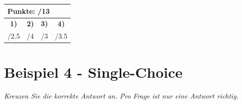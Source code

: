 \documentclass[11pt, a4paper]{article}
\begin{document}
\vfill
\begin{flushright}
\renewcommand{\arraystretch}{1.23}
\begin{tabular}{|c | c | c | c|}
\hline
\multicolumn{4}{|l|}{\textbf{\large{Punkte: \quad\quad\quad /13}}}\\
\hline
\textbf{1)} & \textbf{2)} & \textbf{3)} & \textbf{4)} \\
\quad/2.5 & \quad/4 & \quad/3 & \quad/3.5 \\
\hline
\end{tabular}
\end{flushright}

\newpage

\section*{Beispiel 4 - Single-Choice}
\textit{Kreuzen Sie die korrekte Antwort an. Pro Frage ist nur eine Antwort richtig.}
\end{document}
